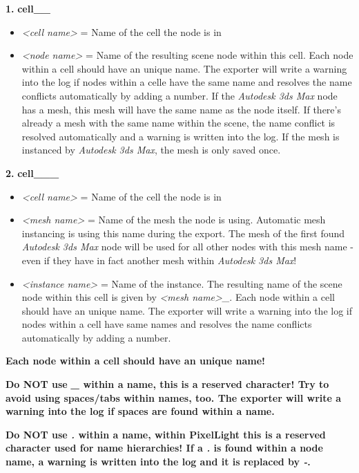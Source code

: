 \textbf{1.}
\textbf{cell\_<cell name>\_<node name>}
\begin{itemize}
\item{\emph{<cell name>} = Name of the cell the node is in}
\item{\emph{<node name>} = Name of the resulting scene node within this cell. Each node within a cell should have an unique name. The exporter will write a warning into the log if nodes within a celle have the same name and resolves the name conflicts automatically by adding a number. If the \emph{Autodesk 3ds Max} node has a mesh, this mesh will have the same name as the node itself. If there's already a mesh with the same name within the scene, the name conflict is resolved automatically and a warning is written into the log. If the mesh is instanced by \emph{Autodesk 3ds Max}, the mesh is only saved once.}
\end{itemize}

\textbf{2.}
\textbf{cell\_<cell name>\_<mesh name>\_<instance name>}
\begin{itemize}
\item{\emph{<cell name>} = Name of the cell the node is in}
\item{\emph{<mesh name>} = Name of the mesh the node is using. Automatic mesh instancing is using this name during the export. The mesh of the first found \emph{Autodesk 3ds Max} node will be used for all other nodes with this mesh name - even if they have in fact another mesh within \emph{Autodesk 3ds Max}!}
\item{\emph{<instance name>} = Name of the instance. The resulting name of the scene node within this cell is given by \emph{<mesh name>\_<instance name>}. Each node within a cell should have an unique name. The exporter will write a warning into the log if nodes within a cell have same names and resolves the name conflicts automatically by adding a number.}
\end{itemize}

\textbf{Each node within a cell should have an unique name!}

\textbf{Do NOT use \emph{\_} within a name, this is a reserved character! Try to avoid using spaces/tabs within names, too. The exporter will write a warning into the log if spaces are found within a name.}

\textbf{Do NOT use \emph{.} within a name, within PixelLight this is a reserved character used for name hierarchies! If  a \emph{.} is found within a node name, a warning is written into the log and it is replaced by \emph{-}.}

